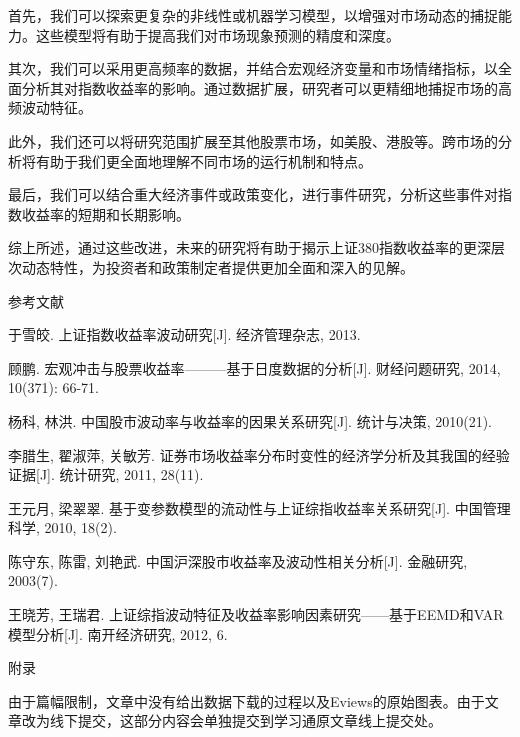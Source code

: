 \documentclass[12pt, a4paper]{article}
\numberwithin{equation}{section}
\begin{document}
首先，我们可以探索更复杂的非线性或机器学习模型，以增强对市场动态的捕捉能力。这些模型将有助于提高我们对市场现象预测的精度和深度。

其次，我们可以采用更高频率的数据，并结合宏观经济变量和市场情绪指标，以全面分析其对指数收益率的影响。通过数据扩展，研究者可以更精细地捕捉市场的高频波动特征。

此外，我们还可以将研究范围扩展至其他股票市场，如美股、港股等。跨市场的分析将有助于我们更全面地理解不同市场的运行机制和特点。

最后，我们可以结合重大经济事件或政策变化，进行事件研究，分析这些事件对指数收益率的短期和长期影响。

综上所述，通过这些改进，未来的研究将有助于揭示上证380指数收益率的更深层次动态特性，为投资者和政策制定者提供更加全面和深入的见解。

\newpage
\begin{center}
    {\heiti \fontsize{18pt}{18pt}\selectfont 参考文献}
\end{center}
\vspace{12pt}

\begin{enumerate}[label={[}\arabic*{]}]
    \item 于雪皎. 上证指数收益率波动研究[J]. 经济管理杂志, 2013.
    \item 顾鹏. 宏观冲击与股票收益率———基于日度数据的分析[J]. 财经问题研究, 2014, 10(371): 66-71.
    \item 杨科, 林洪. 中国股市波动率与收益率的因果关系研究[J]. 统计与决策, 2010(21).
    \item 李腊生, 翟淑萍, 关敏芳. 证券市场收益率分布时变性的经济学分析及其我国的经验证据[J]. 统计研究, 2011, 28(11).
    \item 王元月, 梁翠翠. 基于变参数模型的流动性与上证综指收益率关系研究[J]. 中国管理科学, 2010, 18(2).
    \item 陈守东, 陈雷, 刘艳武. 中国沪深股市收益率及波动性相关分析[J]. 金融研究, 2003(7).
    \item 王晓芳, 王瑞君. 上证综指波动特征及收益率影响因素研究——基于EEMD和VAR模型分析[J]. 南开经济研究, 2012, 6.
\end{enumerate}

\newpage
\begin{center}
    {\heiti{} 附录}
\end{center}

由于篇幅限制，文章中没有给出数据下载的过程以及Eviews的原始图表。由于文章改为线下提交，这部分内容会单独提交到学习通原文章线上提交处。
\end{document}

